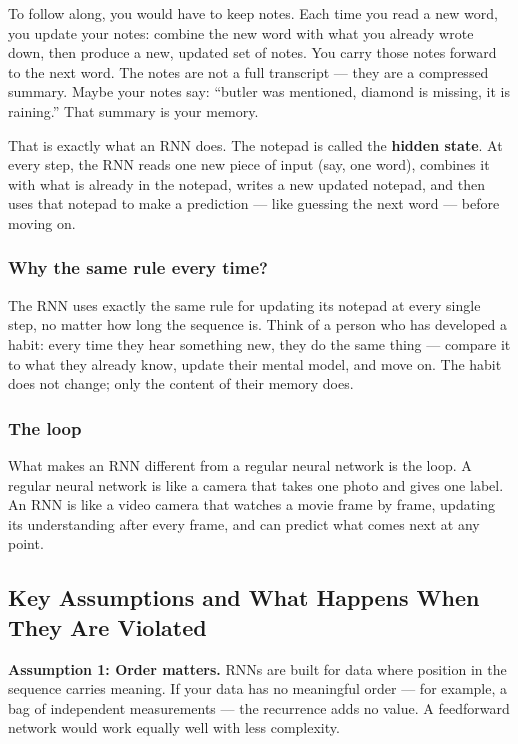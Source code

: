 \documentclass[12pt,a4paper]{article}
\begin{document}
To follow along, you would have to keep notes. Each time you read a new word, you
update your notes: combine the new word with what you already wrote down, then produce
a new, updated set of notes. You carry those notes forward to the next word. The notes
are not a full transcript --- they are a compressed summary. Maybe your notes say:
``butler was mentioned, diamond is missing, it is raining.'' That summary is your
memory.

That is exactly what an RNN does. The notepad is called the \textbf{hidden state}.
At every step, the RNN reads one new piece of input (say, one word), combines it with
what is already in the notepad, writes a new updated notepad, and then uses that notepad
to make a prediction --- like guessing the next word --- before moving on.

\subsubsection{Why the same rule every time?}

The RNN uses exactly the same rule for updating its notepad at every single step,
no matter how long the sequence is. Think of a person who has developed a habit: every
time they hear something new, they do the same thing --- compare it to what they already
know, update their mental model, and move on. The habit does not change; only the
content of their memory does.

\subsubsection{The loop}

What makes an RNN different from a regular neural network is the loop.
A regular neural network is like a camera that takes one photo and gives one label.
An RNN is like a video camera that watches a movie frame by frame, updating its
understanding after every frame, and can predict what comes next at any point.

\subsection{Key Assumptions and What Happens When They Are Violated}

\textbf{Assumption 1: Order matters.}
RNNs are built for data where position in the sequence carries meaning. If your data has
no meaningful order --- for example, a bag of independent measurements --- the recurrence
adds no value. A feedforward network would work equally well with less complexity.
\end{document}
